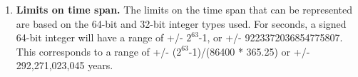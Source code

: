 
\begin{enumerate}

\item {\bf Limits on time span.} The limits on the time span that can be
represented are based on the 64-bit and 32-bit integer types used.  For
seconds, a signed 64-bit integer will have a range of +/- $2^{63}$-1, or
+/- 9223372036854775807.  This corresponds to a range of
+/- ($2^{63}$-1)/(86400 * 365.25) or +/- 292,271,023,045 years.

\end{enumerate}
